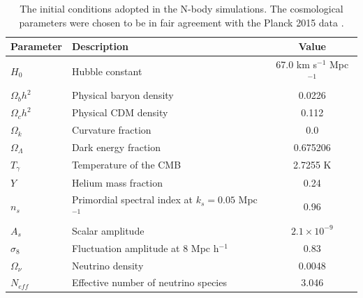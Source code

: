 \documentclass[twocolumn,superscriptaddress,prd]{revtex4}
\begin{document}
\begin{table}[t]
\caption{The initial conditions adopted in
  the N-body simulations.  The cosmological parameters were chosen to
  be in fair agreement with the Planck 2015 data \citep{planck15}.}\label{tbl:initialconditions}
\centering
\begin{tabular}{llc}
\toprule
Parameter & Description & Value \\\hline\hline
$H_0$ & Hubble constant & 67.0 km s$^{-1}$ Mpc$^{-1}$ \\
$\Omega_b h^2$ & Physical baryon density & 0.0226 \\
$\Omega_c h^2$ & Physical CDM density & 0.112 \\
$\Omega_k$ & Curvature fraction & 0.0 \\
$\Omega_\Lambda$ & Dark energy fraction & 0.675206 \\
$T_{\gamma}$ & Temperature of the CMB  & 2.7255 K \\ 
$Y$ & Helium mass fraction & 0.24 \\
$n_s$ & Primordial spectral index at $k_s = 0.05$ Mpc$^{-1}$ & 0.96 \\
$A_s$ & Scalar amplitude & $2.1 \times 10^{-9}$ \\
$\sigma_8$  &Fluctuation amplitude at 8 Mpc h$^{−1}$ & 0.83 \\%
$\Omega_\nu$ & Neutrino density & 0.0048 \footnotemark \\
$N_{eff}$ & Effective number of neutrino species &
                                                        3.046 \\ \bottomrule
\end{tabular}
\end{table}
\end{document}
